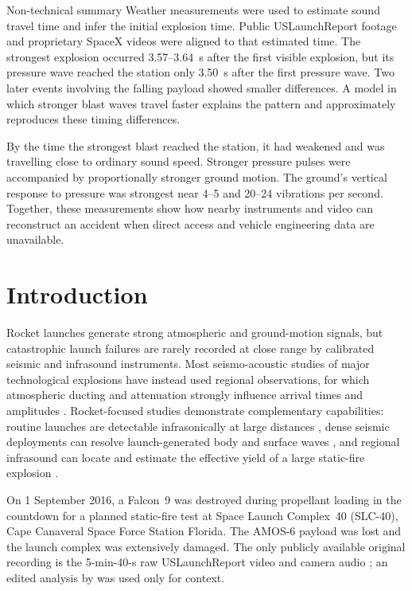 \documentclass[]{seismica}
\begin{document}
{\begin{summary}{Non-technical summary}
  Weather measurements were used to estimate sound travel time and infer
  the initial explosion time. Public USLaunchReport footage and proprietary
  SpaceX videos were aligned to that estimated time. The strongest explosion
  occurred 3.57--3.64~s after the first visible explosion, but its pressure
  wave reached the station only 3.50~s after the first pressure wave.
  Two later events involving the falling payload showed smaller differences.
  A model in which stronger blast waves travel faster explains the pattern
  and approximately reproduces these timing differences.

  By the time the strongest blast reached the station, it had weakened
  and was travelling close to ordinary sound speed. Stronger pressure pulses
  were accompanied by proportionally stronger ground motion. The ground's
  vertical response to pressure was strongest near 4--5 and 20--24
  vibrations per second. Together, these measurements show how nearby
  instruments and video can reconstruct an accident when direct access
  and vehicle engineering data are unavailable.
  \end{summary}
}

\section{Introduction}
\label{sec:introduction}

Rocket launches generate strong atmospheric and ground-motion signals, but
catastrophic launch failures are rarely recorded at close range by calibrated
seismic and infrasound instruments. Most seismo-acoustic studies of major
technological explosions have instead used regional observations, for which
atmospheric ducting and attenuation strongly influence arrival times and
amplitudes \citep{ottemoller_2008,green_2008,ceranna_2009,smink_2019,
pilger_beirut_2021,kim_pasyanos_2022}. Rocket-focused studies demonstrate
complementary capabilities: routine launches are detectable infrasonically at
large distances \citep{pilger_rocket_2021}, dense seismic deployments can
resolve launch-generated body and surface waves
\citep{schuster_rocketquake_2025}, and regional infrasound can locate and
estimate the effective yield of a large static-fire explosion
\citep{silber_scamfer_newglenn_2026}.

On 1 September 2016, a Falcon~9 was destroyed during propellant loading in the
countdown for a planned static-fire test at Space Launch Complex~40 (SLC-40),
Cape Canaveral Space Force Station Florida. The AMOS-6 payload was lost and 
the launch complex was extensively damaged. The only publicly available original 
recording is the 5-min-40-s raw USLaunchReport video and camera audio 
\citep{uslaunchreport_amos6_video_2016}; an edited analysis by 
\citet{manley_spacex_explosion_2016} was used only for context. 
\end{document}
